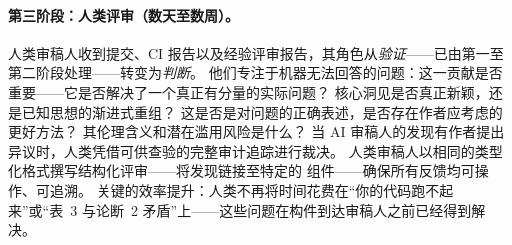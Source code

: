 \paragraph{第三阶段：人类评审（数天至数周）。}
人类审稿人收到提交、CI 报告以及经验评审报告，其角色从\emph{验证}——已由第一至第二阶段处理——转变为\emph{判断}。
他们专注于机器无法回答的问题：这一贡献是否重要——它是否解决了一个真正有分量的实际问题？
核心洞见是否真正新颖，还是已知思想的渐进式重组？
这是否是对问题的正确表述，是否存在作者应考虑的更好方法？
其伦理含义和潜在滥用风险是什么？
当 AI 审稿人的发现有作者提出异议时，人类凭借可供查验的完整审计追踪进行裁决。
人类审稿人以相同的类型化格式撰写结构化评审——将发现链接至特定的 \ara{} 组件——确保所有反馈均可操作、可追溯。
关键的效率提升：人类不再将时间花费在``你的代码跑不起来''或``表~3 与论断~2 矛盾''上——这些问题在构件到达审稿人之前已经得到解决。
